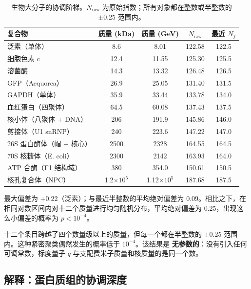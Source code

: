 \documentclass[12pt,a4paper,fontset=fandol]{ctexart}
\begin{document}
	\begin{table}[H]
		\centering
		\caption{生物大分子的协调阶梯。\(N_{\mathrm{raw}}\) 为原始指数；所有对象都在整数或半整数的 \(\pm 0.25\) 范围内。}
		\label{tab:protein_masses}
		\small
		\begin{tabular}{l c c c c}
			\toprule
			复合物 & 质量 (kDa) & 质量 (GeV) & \(N_{\mathrm{raw}}\) & 最近 \(N_f\) \\
			\midrule
			泛素（单体）          & 8.6   & 8.01  & 122.58 & 122.5 \\
			细胞色素 c                 & 12.4  & 11.55 & 125.30 & 125.5 \\
			溶菌酶                     & 14.3  & 13.32 & 126.48 & 126.5 \\
			GFP（Aequorea）               & 26.9  & 25.05 & 131.40 & 131.5 \\
			GAPDH（单体）              & 35.9  & 33.44 & 133.78 & 134.0 \\
			血红蛋白（四聚体）       & 64.5  & 60.08 & 137.43 & 137.5 \\
			核小体（八聚体 + DNA）   & 206   & 191.9 & 145.86 & 146.0 \\
			剪接体（U1 snRNP）       & 240   & 223.6 & 147.22 & 147.0 \\
			26S 蛋白酶体（帽 + 核心）  & 2500  & 2328  & 164.55 & 164.5 \\
			70S 核糖体（E. coli）       & 2300  & 2142  & 163.93 & 164.0 \\
			ATP 合酶（F1 结构域）     & 380   & 354.0 & 150.61 & 150.5 \\
			核孔复合体（NPC）   & 1.2\(\times10^5\) & 1.12\(\times10^5\) & 187.68 & 187.5 \\
			\bottomrule
		\end{tabular}
		\par\smallskip
		\footnotesize
		最大偏差为 \(+0.22\)（泛素）；与最近半整数的平均绝对偏差为 \(0.09\)。相比之下，在相同对数区间内对十二个质量进行均匀随机分布，平均绝对偏差为 \(0.25\)，出现这么小偏差的概率为 \(p < 10^{-4}\)。
	\end{table}
	
	十二个条目跨越了四个数量级以上的质量，但每一个都在半整数的 \(\pm 0.25\) 范围内。这种紧密聚类偶然发生的概率低于 \(10^{-4}\)。该结果是 \textbf{无参数的}：没有引入任何可调常数，标度量子 \(q\) 与支配费米子质量和核质量的是同一个数。
	
	\subsection{解释：蛋白质组的协调深度}
	
\end{document}
